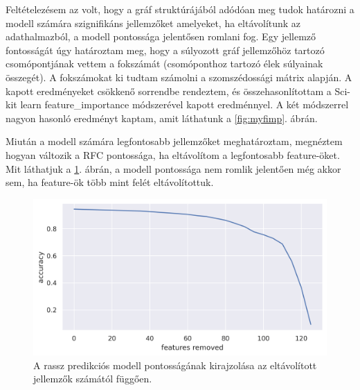 Feltételezésem az volt, hogy a gráf struktúrájából adódóan meg tudok határozni a modell számára szignifikáns jellemzőket amelyeket, ha eltávolítunk az adathalmazból, a modell pontossága jelentősen romlani fog. Egy jellemző fontosságát úgy határoztam meg, hogy a súlyozott gráf jellemzőhöz tartozó csomópontjának vettem a fokszámát (csomóponthoz tartozó élek súlyainak összegét). A fokszámokat ki tudtam számolni a szomszédossági mátrix alapján. A kapott eredményeket csökkenő sorrendbe rendeztem, és összehasonlítottam a Sci-kit learn feature\_importance módszerével kapott eredménnyel. A két módszerrel nagyon hasonló eredményt kaptam, amit láthatunk a \ref{fig:myfimp}. ábrán. 

Miután a modell számára legfontosabb jellemzőket meghatároztam, megnéztem hogyan változik a RFC pontossága, ha eltávolítom a legfontosabb feature-öket. Mit láthatjuk a \ref{fig:retrain_agane}. ábrán, a modell pontossága nem romlik jelentően még akkor sem, ha feature-ök több mint felét eltávolítottuk.

\begin{figure}[ht]
	\centering
	\includegraphics[width=0.8\columnwidth]{figures/network_race_graph.png}
	\caption{A rassz predikciós modell pontosságának kirajzolása az eltávolított jellemzők számától függően.}
	\label{fig:retrain_agane}
\end{figure}
